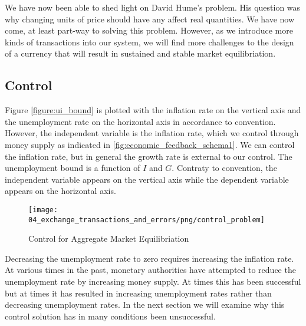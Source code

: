We have now been able to shed light on David Hume's problem. His question was why changing units of
price should have any affect real quantities. We have now come, at least part-way to solving this
problem. However, as we introduce more kinds of transactions into our system, we will find more
challenges to the design of a currency that will result in sustained and stable market
equilibriation.  

\subsection{Control}

Figure \ref{figure:ui_bound} is plotted with the inflation rate on the vertical axis and the
unemployment rate on the horizontal axis in accordance to convention. However, the independent
variable is the inflation rate, which we control through money supply as indicated in
\ref{fig:economic_feedback_schema1}. We can control the inflation rate, but in general the growth
rate is external to our control. The unemployment bound is a function of $I$ and $G$. Contraty to
convention, the independent variable appears on the vertical axis while the dependent variable
appears on the horizontal axis. 

\begin{figure}[H]
\centering
\texttt{[image: 04\_exchange\_transactions\_and\_errors/png/control\_problem]}
\caption{Control for Aggregate Market Equilibriation}
\label{fig:control_problem}
\end{figure}

Decreasing the unemployment rate to zero requires increasing the inflation rate. At various times in
the past, monetary authorities have attempted to reduce the unemployment rate by increasing money
supply. At times this has been successful but at times it has resulted in increasing unemployment
rates rather than decreasing unemployment rates. In the next section we will examine why this
control solution has in many conditions been unsuccessful.
